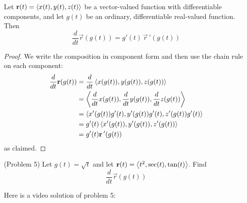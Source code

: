 \documentclass[handout]{ximera}
\begin{document}
\begin{proposition}
Let $\mathbf r(t) = \left\langle x(t), y(t),z(t)\right\rangle$ be a vector-valued function with differentiable components, and let $g(t)$ be an ordinary, differentiable real-valued function.
Then
\[
\frac{d}{dt}\vec r(g(t)) = g'(t)\,\vec r\,'(g(t))
\]
\end{proposition}
\begin{proof}
We write the composition in component form and then use the chain rule on each component:
\begin{align*}
\frac{d}{dt} \mathbf r(g(t)) &= \frac{d}{dt} \left\langle x(g(t)), y(g(t)),z(g(t))\right\rangle\\
&= \left\langle \frac{d}{dt} x(g(t)), \frac{d}{dt} y(g(t)), \frac{d}{dt} z(g(t))\right\rangle\\
&= \left\langle x'(g(t)) g'(t), y'(g(t)) g'(t), z'(g(t)) g'(t)\right\rangle\\
&= g'(t)\left\langle x'(g(t)), y'(g(t)), z'(g(t))\right\rangle\\
&= g'(t) \mathbf r\,'(g(t))
\end{align*}
as claimed.
\end{proof}

\begin{problem}(Problem 5)
Let $g(t) = \sqrt t$ and let $\mathbf r(t) = \left\langle t^2, \sec(t), \tan(t)\right\rangle$. Find
\[
\frac{d}{dt} \vec r(g(t))
\]
\end{problem}
 
Here is a video solution of problem 5:\\
\begin{foldable}
\end{foldable}
\end{document}
